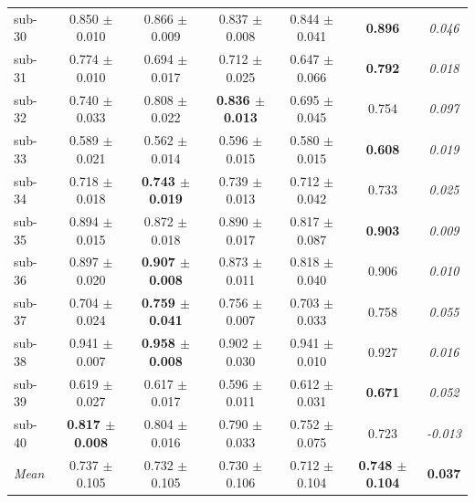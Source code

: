 \begin{table}[t]
\begin{tabular}{lcccccc}
sub-30 & 0.850 $\pm$ 0.010 & 0.866 $\pm$ 0.009 & 0.837 $\pm$ 0.008 & 0.844 $\pm$ 0.041 & \textbf{0.896} & \textit{0.046} \\
sub-31 & 0.774 $\pm$ 0.010 & 0.694 $\pm$ 0.017 & 0.712 $\pm$ 0.025 & 0.647 $\pm$ 0.066 & \textbf{0.792} & \textit{0.018} \\
sub-32 & 0.740 $\pm$ 0.033 & 0.808 $\pm$ 0.022 & \textbf{0.836 $\pm$ 0.013} & 0.695 $\pm$ 0.045 & 0.754 & \textit{0.097} \\
sub-33 & 0.589 $\pm$ 0.021 & 0.562 $\pm$ 0.014 & 0.596 $\pm$ 0.015 & 0.580 $\pm$ 0.015 & \textbf{0.608} & \textit{0.019} \\
sub-34 & 0.718 $\pm$ 0.018 & \textbf{0.743 $\pm$ 0.019} & 0.739 $\pm$ 0.013 & 0.712 $\pm$ 0.042 & 0.733 & \textit{0.025} \\
sub-35 & 0.894 $\pm$ 0.015 & 0.872 $\pm$ 0.018 & 0.890 $\pm$ 0.017 & 0.817 $\pm$ 0.087 & \textbf{0.903} & \textit{0.009} \\
sub-36 & 0.897 $\pm$ 0.020 & \textbf{0.907 $\pm$ 0.008} & 0.873 $\pm$ 0.011 & 0.818 $\pm$ 0.040 & 0.906 & \textit{0.010} \\
sub-37 & 0.704 $\pm$ 0.024 & \textbf{0.759 $\pm$ 0.041} & 0.756 $\pm$ 0.007 & 0.703 $\pm$ 0.033 & 0.758 & \textit{0.055} \\
sub-38 & 0.941 $\pm$ 0.007 & \textbf{0.958 $\pm$ 0.008} & 0.902 $\pm$ 0.030 & 0.941 $\pm$ 0.010 & 0.927 & \textit{0.016} \\
sub-39 & 0.619 $\pm$ 0.027 & 0.617 $\pm$ 0.017 & 0.596 $\pm$ 0.011 & 0.612 $\pm$ 0.031 & \textbf{0.671} & \textit{0.052} \\
sub-40 & \textbf{0.817 $\pm$ 0.008} & 0.804 $\pm$ 0.016 & 0.790 $\pm$ 0.033 & 0.752 $\pm$ 0.075 & 0.723 & \textit{-0.013} \\
\midrule
\textit{Mean} & 0.737 $\pm$ 0.105 & 0.732 $\pm$ 0.105 & 0.730 $\pm$ 0.106 & 0.712 $\pm$ 0.104 & \textbf{0.748 $\pm$ 0.104} & \textbf{0.037} \\
\bottomrule
\end{tabular}
\end{table}


